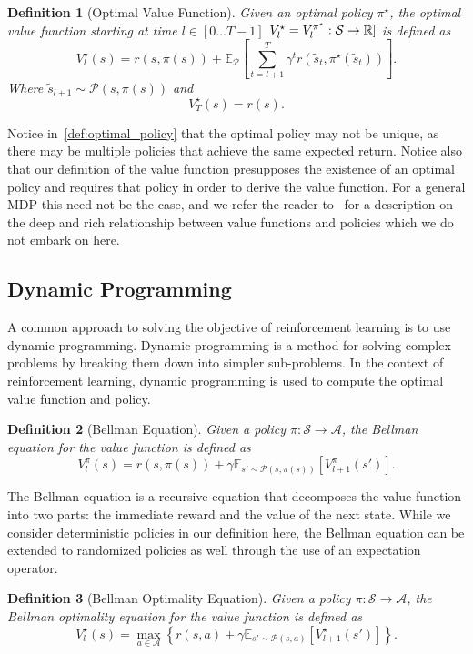 \documentclass[10pt]{article}
\newtheorem{definition}{Definition}
\renewcommand{\cite}{\citep}
\theoremstyle{plain}
\theoremstyle{remark}
\begin{document}
\begin{definition}[Optimal Value Function]\label{def:optimal_value_function}
        Given an optimal policy $\pi^\star$, the optimal value function starting at time $l \in [0\ldots T-1]$ $V^\star_l = V^{\pi^\star}_l : \mathcal{S} \to \mathbb{R}]$ is defined as
        \[
          V^\star_l(s) = r(s,\pi(s)) + \mathbb{E}_{\mathcal{P}} \left[ \sum_{t=l+1}^{T} \gamma^t r(\tilde{s}_t, \pi^\star(\tilde{s}_t)) \right].
        \]
        Where $\tilde{s}_{l+1} \sim \mathcal{P}(s, \pi(s))$ and
        \[
          V^\star_T(s) = r(s).
        \]
\end{definition}

Notice in~\ref{def:optimal_policy} that the optimal policy may not be unique, as there may be multiple policies that achieve the same expected return. Notice also that our definition of the value function presupposes the existence of an optimal policy and requires that policy in order to derive the value function. For a general MDP this need not be the case, and we refer the reader to~\cite{Puterman1994} for a description on the deep and rich relationship between value functions and policies which we do not embark on here.


\subsection{Dynamic Programming}
A common approach to solving the objective of reinforcement learning is to use dynamic programming. Dynamic programming is a method for solving complex problems by breaking them down into simpler sub-problems. In the context of reinforcement learning, dynamic programming is used to compute the optimal value function and policy.

\begin{definition}[Bellman Equation]\label{def:bellman}
        Given a policy $\pi : \mathcal{S} \to \mathcal{A}$, the Bellman equation for the value function is defined as
        \[
                V^\pi_l(s) = r(s, \pi(s)) + \gamma \mathbb{E}_{s' \sim \mathcal{P}(s, \pi(s))} [V^\pi_{l+1}(s')].
        \]
\end{definition}
The Bellman equation is a recursive equation that decomposes the value function into two parts: the immediate reward and the value of the next state. While we
consider deterministic policies in our definition here, the Bellman equation can be extended to randomized policies as well through the use of an expectation operator.

\begin{definition}[Bellman Optimality Equation]\label{def:bellman_optimality}
        Given a policy $\pi : \mathcal{S} \to \mathcal{A}$, the Bellman optimality equation for the value function is defined as
        \[
                V^\star_l(s) = \max_{a \in \mathcal{A}} \left\{ r(s, a) + \gamma \mathbb{E}_{s' \sim \mathcal{P}(s, a)} [V^\star_{l+1}(s')] \right\}.
        \]
\end{definition}
\end{document}
